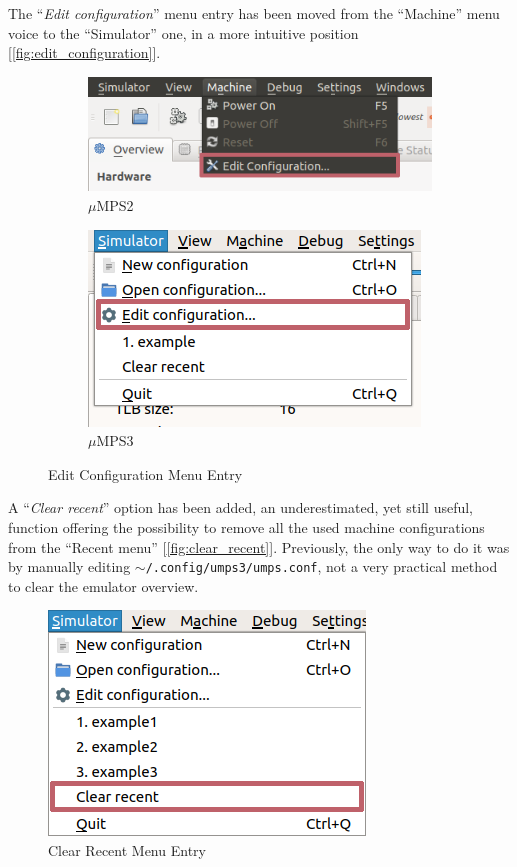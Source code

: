 \documentclass[12pt,a4paper,openright,twoside]{report}
\begin{document}
The ``\textit{Edit configuration}'' menu entry has been moved from the ``Machine'' menu voice to the ``Simulator'' one, in a more intuitive position [\autoref{fig:edit_configuration}].
\clearpage
\begin{figure}[h]
	\centering
	\begin{subfigure}[h]{\textwidth}
		\centering
		\includegraphics[scale=0.75]{edit_configuration_old}
		\caption{$\mu$MPS2}
		\label{fig:edit_configuration_old}
	\end{subfigure}
	\newline
	\begin{subfigure}[h]{\textwidth}
		\centering
		\includegraphics[scale=0.75]{edit_configuration}
		\caption{$\mu$MPS3}
		\label{fig:edit_configuration_new}
	\end{subfigure}
	\caption{Edit Configuration Menu Entry}
	\label{fig:edit_configuration}
\end{figure}

A ``\textit{Clear recent}'' option has been added, an underestimated, yet still useful, function offering the possibility to remove all the used machine configurations from the ``Recent menu'' [\autoref{fig:clear_recent}].
Previously, the only way to do it was by manually editing \texttt{$\sim$/.config/umps3/umps.conf}, not a very practical method to clear the emulator overview.
\begin{figure}[h]
	\centering
	\includegraphics[scale=0.75]{clear_recent}
	\caption{Clear Recent Menu Entry}
	\label{fig:clear_recent}
\end{figure}
\end{document}
